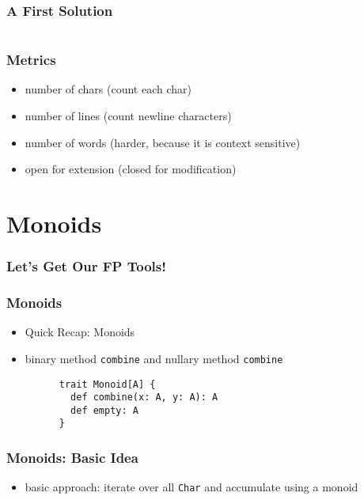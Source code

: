 \documentclass[aspectratio=169]{beamer}
\begin{document}
\begin{frame}[fragile]
  \frametitle{A First Solution}
  \inputminted[fontsize=\small]{scala}{snippets/imperative-wc.scala}
\end{frame}

\begin{frame}
  \frametitle{Metrics}
  \begin{itemize}
  \item number of chars (count each char)
  \item number of lines (count newline characters)
  \item number of words (harder, because it is context sensitive)
  \item open for extension (closed for modification)
  \end{itemize}
\end{frame}

\section{Monoids}\label{sec:monoids}

\begin{frame}
  \frametitle{Let's Get Our FP Tools!}
\end{frame}

\begin{frame}[fragile]
  \frametitle{Monoids}
  \begin{itemize}
  \item Quick Recap: Monoids
  \item binary method \texttt{combine} and nullary method \texttt{combine}
    \begin{verbatim}
      trait Monoid[A] {
        def combine(x: A, y: A): A
        def empty: A
      }
    \end{verbatim}
  \end{itemize}
\end{frame}

\begin{frame}
  \frametitle{Monoids: Basic Idea}
  \begin{itemize}
  \item basic approach: iterate over all \texttt{Char} and accumulate using a monoid
  \end{itemize}
\end{frame}
\end{document}
